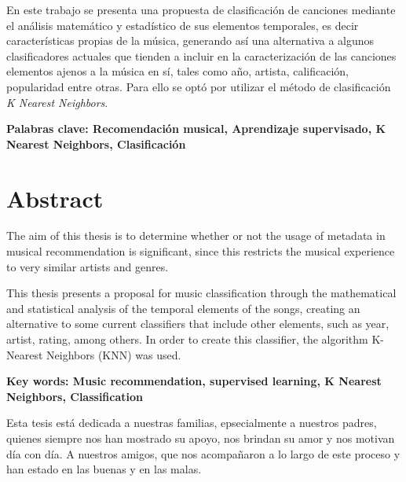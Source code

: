 En este trabajo se presenta una propuesta de clasificación de canciones mediante el análisis matemático y estadístico de sus elementos temporales, es decir características propias de la música, generando así una alternativa a algunos clasificadores actuales que tienden a incluir en la caracterización de las canciones elementos ajenos a la música en sí, tales como año, artista, calificación, popularidad entre otras. Para ello se optó por utilizar el método de clasificación \textit{K Nearest Neighbors}.


\bigskip

\textbf{Palabras clave: Recomendación musical, Aprendizaje supervisado, K Nearest Neighbors, Clasificación} 


\chapter{Abstract}
The aim of this thesis is to determine whether or not the usage of metadata in musical recommendation is significant, since this restricts the musical experience to very similar artists and genres.

This thesis presents a proposal for music classification through the mathematical and statistical analysis of the temporal elements of the songs, creating an alternative to some current classifiers that include other elements, such as year, artist, rating, among others. In order to create this classifier, the algorithm K-Nearest Neighbors (KNN) was used.

\bigskip

\textbf{Key words: Music recommendation, supervised learning, K Nearest Neighbors, Classification} 

 \begin{dedication}
 \vspace*{2cm}


 \begin{center}
     Esta tesis está dedicada a nuestras familias, epsecialmente a nuestros padres, quienes siempre nos han mostrado su apoyo, nos brindan su amor y nos motivan día con día. A nuestros amigos, que nos acompañaron a lo largo de este proceso y han estado en las buenas y en las malas.
 	\par\end{center}
\end{dedication}

\cleardoublepage

